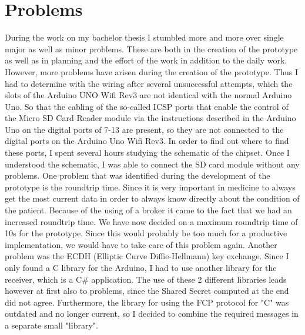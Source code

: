 \chapter{Problems}
During the work on my bachelor thesis I stumbled more and more over single major as well as minor problems. 
These are both in the creation of the prototype as well as in planning and the effort of the work in addition to the daily work.
However, more problems have arisen during the creation of the prototype. Thus I had to determine with the wiring after several unsuccessful attempts, which the slots of the Arduino UNO Wifi Rev3 are not identical with the normal Arduino Uno. 
\newline
So that the cabling of the so-called ICSP ports that enable the control of the Micro SD Card Reader module via the instructions described in the Arduino Uno on the digital ports of 7-13 are present, so they are not connected to the digital ports on the Arduino Uno Wifi Rev3. In order to find out where to find these ports, I spent several hours studying the schematic of the chipset. Once I understood the schematic, I was able to connect the SD card module without any problems.
\newline
One problem that was identified during the development of the prototype is the roundtrip time. Since it is very important in medicine to always get the most current data in order to always know directly about the condition of the patient. Because of the using of a broker it came to the fact that we had an increased roundtrip time. We have now decided on a maximum roundtrip time of 10s for the prototype. Since this would probably be too much for a productive implementation, we would have to take care of this problem again.
Another problem was the ECDH (Elliptic Curve Diffie-Hellmann) key exchange. Since I only found a C library for the Arduino, I had to use another library for the receiver, which is a C# application. 
The use of these 2 different libraries leads however at first also to problems, since the Shared Secret computed at the end did not agree.
Furthermore, the library for using the FCP protocol for "C" was outdated and no longer current, so I decided to combine the required messages in a separate small "library".